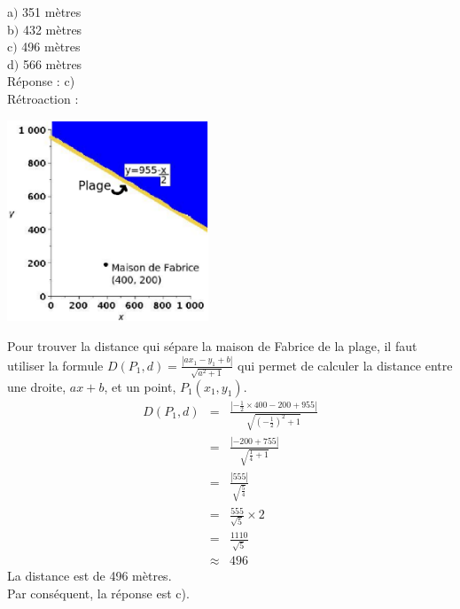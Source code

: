 \documentclass[letterpaper, 12pt]{article}
\begin{document}
a$)$  351 m\`etres\\
b$)$  432 m\`etres\\
c$)$  496 m\`etres\\
d$)$  566 m\`etres\\

R\'eponse : c) \\

R\'etroaction :\\
\begin{center}
 \includegraphics[width=6cm,bb=14 14 582 582]{Q2434q.eps}
\end{center}
Pour trouver la distance qui s\'epare la maison de Fabrice de la plage, il faut utiliser la formule $D(P_{1}, d)=\frac{|ax_{1}-y_{1}+b|}{\sqrt{a^{2}+1}}$ qui permet de calculer la distance entre une droite, $ax+b$, et un point, $P_{1}(x_{1},y_{1})$.
\begin{eqnarray*}
 D(P_{1}, d)&=&\frac{|-\frac{1}{2}\times 400-200+955|}{\sqrt{(-\frac{1}{2})^{2}+1}}\\[2mm]
&=&\frac{|-200+755|}{\sqrt{\frac{1}{4}+1}}\\[2mm]
&=&\frac{|555|}{\sqrt{\frac{5}{4}}}\\[2mm]
&=&\frac{555}{\sqrt{5}}\times 2\\[2mm]
&=&\frac{1110}{\sqrt{5}}\\[2mm]
&\approx&496
\end{eqnarray*}
La distance est de 496 m\`etres.\\
Par cons\'equent, la r\'eponse est c).\\
\end{document}
